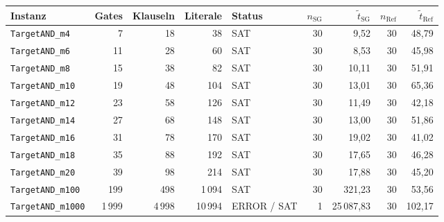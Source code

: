 \begin{tabular}{lrrrlrrrr}
\toprule
Instanz & Gates & Klauseln & Literale & Status & $n_{\mathrm{SG}}$ & $\tilde{t}_{\mathrm{SG}}$ & $n_{\mathrm{Ref}}$ & $\tilde{t}_{\mathrm{Ref}}$ \\
\midrule
\texttt{TargetAND\_m4} & 7 & 18 & 38 & SAT & 30 & 9{,}52 & 30 & 48{,}79 \\
\texttt{TargetAND\_m6} & 11 & 28 & 60 & SAT & 30 & 8{,}53 & 30 & 45{,}98 \\
\texttt{TargetAND\_m8} & 15 & 38 & 82 & SAT & 30 & 10{,}11 & 30 & 51{,}91 \\
\texttt{TargetAND\_m10} & 19 & 48 & 104 & SAT & 30 & 13{,}01 & 30 & 65{,}36 \\
\texttt{TargetAND\_m12} & 23 & 58 & 126 & SAT & 30 & 11{,}49 & 30 & 42{,}18 \\
\texttt{TargetAND\_m14} & 27 & 68 & 148 & SAT & 30 & 13{,}00 & 30 & 51{,}86 \\
\texttt{TargetAND\_m16} & 31 & 78 & 170 & SAT & 30 & 19{,}02 & 30 & 41{,}02 \\
\texttt{TargetAND\_m18} & 35 & 88 & 192 & SAT & 30 & 17{,}65 & 30 & 46{,}28 \\
\texttt{TargetAND\_m20} & 39 & 98 & 214 & SAT & 30 & 17{,}88 & 30 & 45{,}20 \\
\texttt{TargetAND\_m100} & 199 & 498 & 1\,094 & SAT & 30 & 321{,}23 & 30 & 53{,}56 \\
\texttt{TargetAND\_m1000} & 1\,999 & 4\,998 & 10\,994 & ERROR / SAT & 1 & 25\,087{,}83 & 30 & 102{,}17 \\
\bottomrule
\end{tabular}
